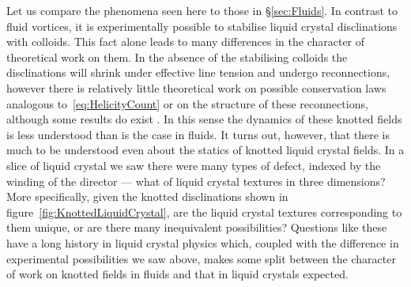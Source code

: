 Let us compare the phenomena seen here to those in \S\ref{sec:Fluids}. In contrast to fluid vortices, it is experimentally possible to stabilise liquid crystal disclinations with colloids. This fact alone leads to many differences in the character of theoretical work on them. In the absence of the stabilising colloids the disclinations will shrink under effective line tension and undergo reconnections, however there is relatively little theoretical work on possible conservation laws analogous to~\eqref{eq:HelicityCount} or on the structure of these reconnections, although some results do exist \citep{Copar2011,Machon2017}. In this sense the dynamics of these knotted fields is less understood than is the case in fluids. It turns out, however, that there is much to be understood even about the statics of knotted liquid crystal fields. In a slice of liquid crystal we saw there were many types of defect, indexed by the winding of the director --- what of liquid crystal textures in three dimensions? More specifically, given the knotted disclinations shown in figure~\ref{fig:KnottedLiquidCrystal}, are the liquid crystal textures corresponding to them unique, or are there many inequivalent possibilities? Questions like these have a long history in liquid crystal physics which, coupled with the difference in experimental possibilities we saw above, makes some split between the character of work on knotted fields in fluids and that in liquid crystals expected.


